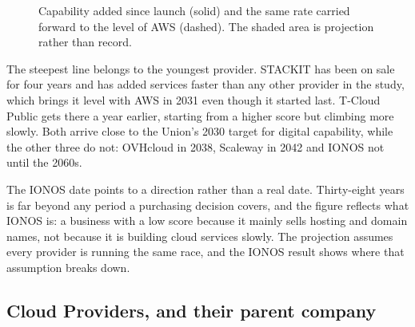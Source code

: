 \begin{figure}[htbp]
  \caption{Capability added since launch (solid) and the same rate carried
           forward to the level of \acs{AWS} (dashed). The shaded area is
           projection rather than record.}
  \label{fig:parity-projection}
\end{figure}

The steepest line belongs to the youngest provider. STACKIT has been on sale for
four years and has added services faster than any other provider in the study,
which brings it level with \acs{AWS} in 2031 even though it started last. T-Cloud
Public gets there a year earlier, starting from a higher score but climbing more
slowly. Both arrive close to the Union's 2030 target for digital capability, while
the other three do not: OVHcloud in 2038, Scaleway in 2042 and IONOS not until the
2060s.

The IONOS date points to a direction rather than a real date. Thirty-eight years is
far beyond any period a purchasing decision covers, and the figure reflects what
IONOS is: a business with a low score because it mainly sells hosting and domain
names, not because it is building cloud services slowly. The projection assumes
every provider is running the same race, and the IONOS result shows where that
assumption breaks down.

\subsection{Cloud Providers, and their parent company}

